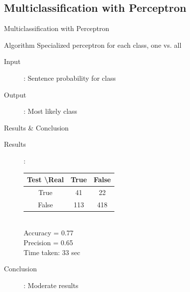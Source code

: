\documentclass{beamer}
\begin{document}
\subsection{Multiclassification with Perceptron}
\begin{frame}{Multiclassification with Perceptron}
\begin{block}{Algorithm}
Specialized perceptron for each class, one vs. all
\end{block}
\begin{description}
\item[Input]: Sentence probability for class
\item[Output]: Most likely class
\end{description}
\end{frame}
\begin{frame}{Results \& Conclusion}
\begin{description}
\item[Results]: 
\begin{tabular}{c || c | c}\\
Test \textbackslash Real & True & False \\
\hline
True & 41 & 22 \\
False & 113 & 418 \\
\end{tabular}\\
Accuracy =  0.77\\
Precision =  0.65\\
Time taken:  33 sec
\item[Conclusion]: Moderate results
\end{description}
\end{frame}

\end{document}
